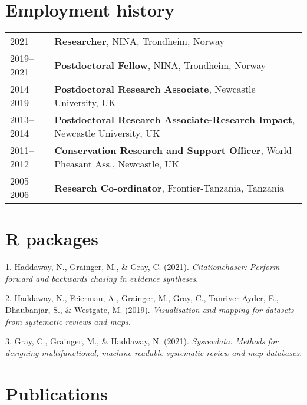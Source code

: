 \documentclass[11pt, a4paper]{awesome-cv}
\begin{document}
\hypertarget{employment-history}{%
\section{Employment history}\label{employment-history}}

\begin{tabular}{ll}
  2021-- & \textbf{ Researcher}, NINA, Trondheim, Norway \\ 
  2019--2021 & \textbf{ Postdoctoral Fellow}, NINA, Trondheim, Norway \\ 
  2014--2019 & \textbf{ Postdoctoral Research Associate}, Newcastle University, UK \\ 
  2013--2014 & \textbf{ Postdoctoral Research Associate-Research Impact}, Newcastle University, UK \\ 
  2011--2012 & \textbf{ Conservation Research and Support Officer}, World Pheasant Ass., Newcastle, UK \\ 
  2005--2006 & \textbf{ Research Co-ordinator}, Frontier-Tanzania, Tanzania \\ 
  \end{tabular}

\hypertarget{r-packages}{%
\section{R packages}\label{r-packages}}

\hypertarget{bibliography}{}
\leavevmode\hypertarget{ref-R-citationchaser}{}%
1. Haddaway, N., Grainger, M., \& Gray, C. (2021). \emph{Citationchaser:
Perform forward and backwards chasing in evidence syntheses}.

\leavevmode\hypertarget{ref-R-eviatlas}{}%
2. Haddaway, N., Feierman, A., Grainger, M., Gray, C., Tanriver-Ayder,
E., Dhaubanjar, S., \& Westgate, M. (2019). \emph{Visualisation and
mapping for datasets from systematic reviews and maps}.

\leavevmode\hypertarget{ref-R-sysrevdata}{}%
3. Gray, C., Grainger, M., \& Haddaway, N. (2021). \emph{Sysrevdata:
Methods for designing multifunctional, machine readable systematic
review and map databases}.

\hypertarget{publications}{%
\section{Publications}\label{publications}}
\end{document}
